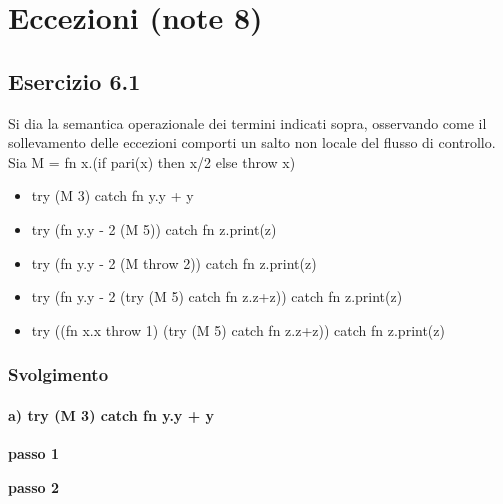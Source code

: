\section{Eccezioni (note 8)}
\subsection*{Esercizio 6.1}
Si dia la semantica operazionale dei termini indicati sopra, osservando come il sollevamento delle eccezioni comporti un salto non locale del flusso di controllo.
Sia M = fn x.(if pari(x) then x/2 else throw x)
\begin{itemize}
	\item try (M 3) catch fn y.y + y
	\item try (fn y.y - 2 (M 5)) catch fn z.print(z)
	\item try (fn y.y - 2 (M throw 2)) catch fn z.print(z)
	\item try (fn y.y - 2 (try (M 5) catch fn z.z+z)) catch fn z.print(z)
	\item try ((fn x.x throw 1) (try (M 5) catch fn z.z+z)) catch fn z.print(z)
\end{itemize}  

\subsubsection*{Svolgimento} 

\paragraph{a) try (M 3) catch fn y.y + y}\mbox{}

\textbf{passo 1} 
\begin{prooftree} 
\end{prooftree}

\textbf{passo 2} \\		

